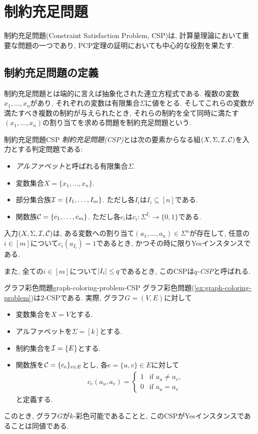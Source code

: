 \chapter{制約充足問題} \label{chap:CSP}
制約充足問題(Constraint Satisfaction Problem, CSP)は, 計算量理論において重要な問題の一つであり,
PCP定理の証明においても中心的な役割を果たす.

\section{制約充足問題の定義}
制約充足問題とは端的に言えば抽象化された連立方程式である.
複数の変数$x_1,\dots,x_n$があり, それぞれの変数は有限集合$\Sigma$に値をとる.
そしてこれらの変数が満たすべき複数の制約が与えられたとき, それらの制約を全て同時に満たす$(x_1,\dots,x_n)$の割り当てを求める問題を制約充足問題という.

\begin{definition}{制約充足問題}{CSP}
\emph{制約充足問題(CSP)}とは次の要素からなる組$(X,\Sigma,\mathcal{I},\mathcal{C})$を入力とする判定問題である:
\begin{itemize}
  \item \emph{アルファベット}と呼ばれる有限集合$\Sigma$.
  \item 変数集合$X=\{x_1,\dots,x_n\}$.
  \item 部分集合族$\mathcal{I}=\{I_1,\dots,I_m\}$. ただし各$I_i$は$I_i\subseteq[n]$である.
  \item 関数族$\mathcal{C}=\{c_1,\dots,c_m\}$. ただし各$c_i$は$c_i: \Sigma^{I_i}\to\{0,1\}$である.
\end{itemize}
入力$(X,\Sigma,\mathcal{I},\mathcal{C})$は,
ある変数への割り当て$(a_1,\dots,a_n)\in\Sigma^n$が存在して, 任意の$i\in[m]$について$c_i(a_{I_i})=1$であるとき, かつその時に限りYesインスタンスである.

また, 全ての$i\in[m]$について$\abs{I_i}\le q$であるとき, このCSPは\emph{$q$-CSP}と呼ばれる.
\end{definition}

\begin{example}{グラフ彩色問題}{graph-coloring-problem-CSP}
  グラフ彩色問題(\cref{ex:graph-coloring-problem})は$2$-CSPである.
  実際, グラフ$G=(V,E)$に対して
  \begin{itemize}
    \item 変数集合を$X=V$とする.
    \item アルファベットを$\Sigma=[k]$とする.
    \item 制約集合を$\mathcal{I}=\{E\}$とする.
    \item 関数族を$\mathcal{C}=\{c_e\}_{e\in E}$とし, 各$e=\{u,v\}\in E$に対して
    \begin{align*}
      c_e(a_u,a_v) = \begin{cases}
        1 & \text{if } a_u\neq a_v, \\
        0 & \text{if } a_u=a_v
      \end{cases}
    \end{align*}
    と定義する.
  \end{itemize}
  このとき, グラフ$G$が$k$-彩色可能であることと, このCSPがYesインスタンスであることは同値である.
\end{example}

